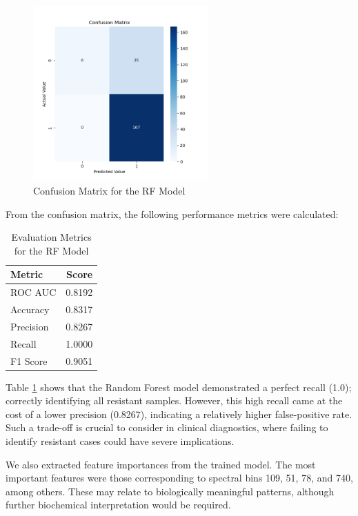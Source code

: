 \documentclass{article}
\begin{document}
\begin{figure}[h]
  \centering
  \includegraphics[width=0.6\textwidth]{confusion_matrix_Random_Forest.png}
  \caption{Confusion Matrix for the RF Model}
  \label{fig:rf_confusion_matrix}
\end{figure}

From the confusion matrix, the following performance metrics were calculated:

\begin{table}[h]
\centering
\caption{Evaluation Metrics for the RF Model}
\label{tab:Random Forest Performance Metrics}
\begin{tabular}{lr}
\toprule
\textbf{Metric} & \textbf{Score} \\
\midrule
ROC AUC   & 0.8192 \\
Accuracy  & 0.8317 \\
Precision & 0.8267 \\
Recall    & 1.0000 \\
F1 Score  & 0.9051 \\
\bottomrule
\end{tabular}
\end{table}

Table \ref{tab:Random Forest Performance Metrics} shows that the Random Forest model demonstrated a perfect recall (1.0); correctly identifying all resistant samples. However, this high recall came at the cost of a lower precision (0.8267), indicating a relatively higher false-positive rate. Such a trade-off is crucial to consider in clinical diagnostics, where failing to identify resistant cases could have severe implications.

We also extracted feature importances from the trained model. The most important features were those corresponding to spectral bins 109, 51, 78, and 740, among others. These may relate to biologically meaningful patterns, although further biochemical interpretation would be required.
\end{document}
